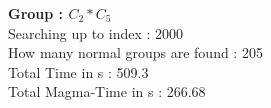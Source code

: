 \textbf{Group : $C_2*C_5$}\\
Searching up to index : 2000\\
How many normal groups are found : 205\\
Total Time in s : 509.3\\
Total Magma-Time in s : 266.68\\
